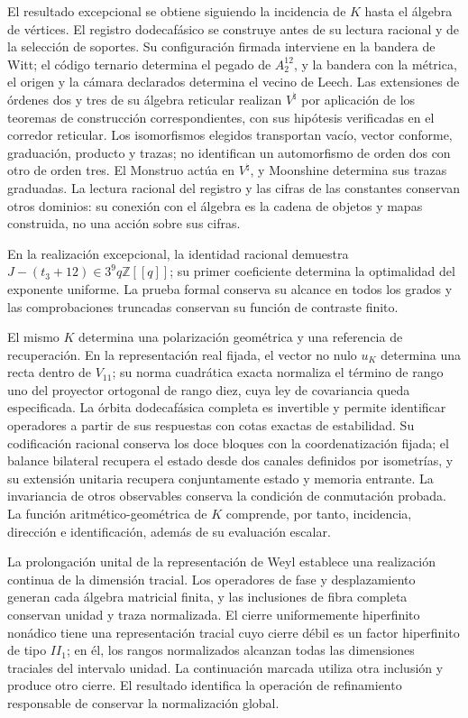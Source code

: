 El resultado excepcional se obtiene siguiendo la incidencia de \(K\)
hasta el álgebra de vértices. El registro dodecafásico se construye antes
de su lectura racional y de la selección de soportes. Su configuración
firmada interviene en la bandera de Witt; el código ternario determina
el pegado de \(A_2^{12}\), y la bandera con la métrica, el origen y la
cámara declarados determina el vecino de Leech. Las extensiones de
órdenes dos y tres de su álgebra reticular realizan \(V^\natural\)
por aplicación de los teoremas de construcción correspondientes, con
sus hipótesis verificadas en el corredor reticular. Los isomorfismos
elegidos transportan vacío, vector conforme, graduación, producto y
trazas; no identifican un automorfismo de orden dos con otro de orden
tres. El Monstruo actúa en \(V^\natural\), y Moonshine determina sus
trazas graduadas. La lectura racional del registro y las cifras de las
constantes conservan otros dominios: su conexión con el álgebra es la
cadena de objetos y mapas construida, no una acción sobre sus cifras.

En la realización
excepcional, la identidad racional demuestra
\(J-(t_3+12)\in3^9q\mathbb Z[[q]]\); su primer coeficiente determina
la optimalidad del exponente uniforme. La prueba formal conserva su
alcance en todos los grados y las comprobaciones truncadas conservan
su función de contraste finito.

El mismo \(K\) determina una polarización geométrica y una referencia
de recuperación. En la representación real fijada, el vector no nulo
\(u_K\) determina una recta dentro de \(V_{11}\); su norma cuadrática
exacta normaliza el término de rango uno del proyector ortogonal de rango
diez, cuya ley de covariancia queda especificada.
La órbita dodecafásica completa es invertible y permite identificar
operadores a partir de sus respuestas con cotas exactas de estabilidad.
Su codificación racional conserva los doce bloques con la coordenatización fijada;
el balance bilateral recupera el estado desde dos canales definidos por isometrías,
y su extensión unitaria recupera conjuntamente estado y memoria
entrante. La invariancia de otros observables conserva la condición
de conmutación probada. La función aritmético-geométrica de \(K\)
comprende, por tanto, incidencia, dirección e identificación, además
de su evaluación escalar.

La prolongación unital de la representación de Weyl establece una
realización continua de la dimensión tracial. Los operadores de fase
y desplazamiento generan cada álgebra matricial finita, y las
inclusiones de fibra completa conservan unidad y traza normalizada.
El cierre uniformemente hiperfinito nonádico tiene una representación
tracial cuyo cierre débil es un factor hiperfinito de tipo \(II_1\);
en él, los rangos normalizados alcanzan todas las dimensiones traciales
del intervalo unidad. La continuación marcada utiliza otra inclusión
y produce otro cierre. El resultado identifica la operación de
refinamiento responsable de conservar la normalización global.

